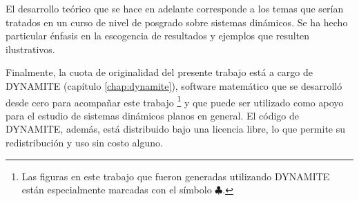 El desarrollo teórico que se hace en adelante corresponde a los temas que serían tratados en un curso de nivel de posgrado sobre sistemas dinámicos. Se ha hecho particular énfasis en la escogencia de resultados y ejemplos que resulten ilustrativos.

Finalmente, la cuota de originalidad del presente trabajo está a cargo de DYNAMITE (capítulo \ref{chap:dynamite}), software matemático que se desarrolló desde cero para acompañar este trabajo \footnote{Las figuras en este trabajo que fueron generadas  utilizando DYNAMITE están especialmente marcadas con el símbolo $\clubsuit$.} y que puede ser utilizado como apoyo para el estudio de sistemas dinámicos planos en general. El código de DYNAMITE, además, está distribuido bajo una licencia libre, lo que permite su redistribución y uso sin costo alguno.